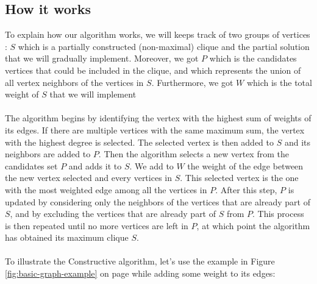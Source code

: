 
\subsection{How it works}

    To explain how our algorithm works, we will keeps track of two groups of vertices : $S$ which is a partially constructed (non-maximal) clique and the partial solution that we will gradually implement. Moreover, we got $P$  which is the candidates vertices that could be included in the clique, and which represents the union of all vertex neighbors of the vertices in $S$. Furthermore, we got $W$ which is the total weight of $S$ that we will implement
    \\ \\
    The algorithm begins by identifying the vertex with the highest sum of weights of its edges. If there are multiple vertices with the same maximum sum, the vertex with the highest degree is selected. The selected vertex is then added to $S$ and its neighbors are added to $P$. Then the algorithm selects a new vertex from the candidates set $P$ and adds it to $S$. We add to $W$ the weight of the edge between the new vertex selected and every vertices in $S$. This selected vertex is the one with the most weighted edge among all the vertices in $P$. After this step, $P$ is updated by considering only the neighbors of the vertices that are already part of $S$, and by excluding the vertices that are already part of $S$ from $P$. This process is then repeated until no more vertices are left in $P$, at which point the algorithm has obtained its maximum clique $S$.
    \\ \\
    To illustrate the Constructive algorithm, let's use the example in
    Figure \ref{fig:basic-graph-example} on page \pageref{fig:basic-graph-example} while adding some weight to its edges: \\

